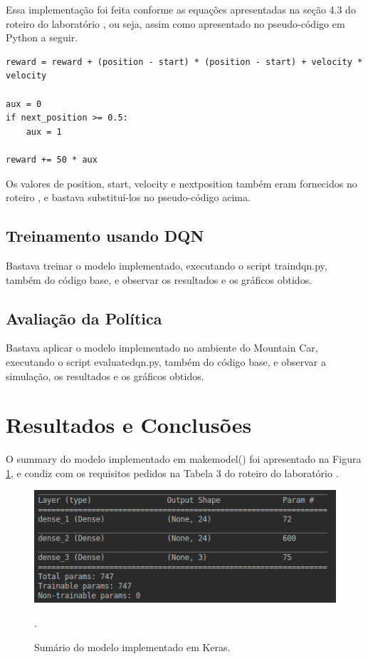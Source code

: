 \documentclass[conference]{IEEEtran}
\begin{document}
	Essa implementação foi feita conforme as equações apresentadas na seção 4.3 do roteiro do laboratório \cite{roteiro}, ou seja, assim como apresentado no pseudo-código em Python a seguir.
	
\begin{lstlisting}
reward = reward + (position - start) * (position - start) + velocity * velocity

aux = 0
if next_position >= 0.5:
    aux = 1

reward += 50 * aux
\end{lstlisting}

	Os valores de position, start, velocity e next\underline{\space}position também eram fornecidos no roteiro \cite{roteiro}, e bastava substituí-los no pseudo-código acima.

	\subsection{Treinamento usando DQN}
	
	Bastava treinar o modelo implementado, executando o script train\underline{\space}dqn.py, também do código base, e observar os resultados e os gráficos obtidos.

	\subsection{Avaliação da Política}
	
	Bastava aplicar o modelo implementado no ambiente do Mountain Car, executando o script evaluate\underline{\space}dqn.py, também do código base, e observar a simulação, os resultados e os gráficos obtidos.

\section{Resultados e Conclusões} \label{results}

	O summary do modelo implementado em make\underline{\space}model() foi apresentado na Figura \ref{summary}, e condiz com os requisitos pedidos na Tabela 3 do roteiro do laboratório \cite{roteiro}. 

\begin{figure}[htbp]
\centering
\centerline{\includegraphics[scale=0.5]{imagens/summary.png}}
\caption{Sumário do modelo implementado em Keras.}.
\label{summary}
\end{figure}
\end{document}
